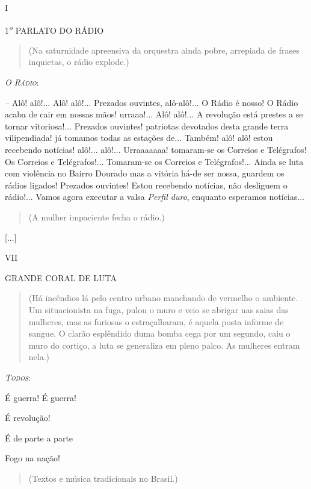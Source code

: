 I

\textsc{1}\textsuperscript{\emph{o}} \textsc{PARLATO DO RÁDIO}

\begin{quote}
(Na saturnidade apreensiva da orquestra ainda pobre, arrepiada de frases
inquietas, o rádio explode.)
\end{quote}

\emph{\textsc{O Rádio}}:

\emph{--} Alô! alô!... Alô! alô!... Prezados ouvintes, alô-alô!... O
Rádio é nosso! O Rádio acaba de cair em nossas mãos! urraaa!... Alô!
alô!... A revolução está prestes a se tornar vitoriosa!... Prezados
ouvintes! patriotas devotados desta grande terra vilipendiada! já
tomamos todas as estações de... Também! alô! alô! estou recebendo
notícias! alô!... alô!... Urraaaaaaa! tomaram-se os Correios e
Telégrafos! Os Correios e Telégrafos!... Tomaram-se os Correios e
Telégrafos!... Ainda se luta com violência no Bairro Dourado mas a
vitória há-de ser nossa, guardem os rádios ligados! Prezados ouvintes!
Estou recebendo notícias, não desliguem o rádio!... Vamos agora executar
a valsa \emph{Perfil duro}, enquanto esperamos notícias...

\begin{quote}
(A mulher impaciente fecha o rádio.)
\end{quote}

{[}...{]}

VII

GRANDE CORAL DE LUTA

\begin{quote}
(Há incêndios lá pelo centro urbano manchando de vermelho o ambiente. Um
situacionista na fuga, pulou o muro e veio se abrigar nas saias das
mulheres, mas as furiosas o estraçalharam, é aquela posta informe de
sangue. O clarão esplêndido duma bomba cega por um segundo, caiu o muro
do cortiço, a luta se generaliza em pleno palco. As mulheres entram
nela.)
\end{quote}

\emph{\textsc{Todos}}:

É guerra! É guerra!

É revolução!

É de parte a parte

Fogo na nação!


\begin{quote}
(Textos e música tradicionais no Brasil.)
\end{quote}

